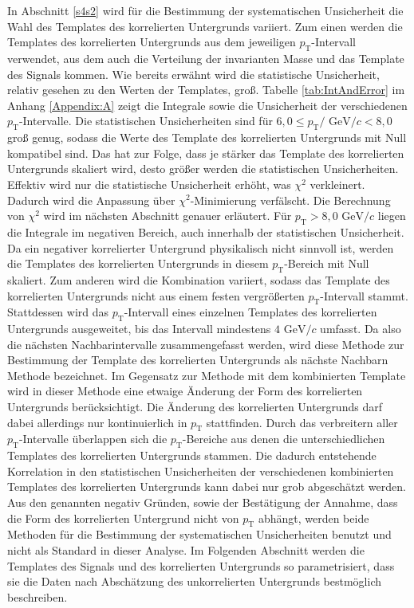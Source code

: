 In Abschnitt \ref{s4s2} wird für die Bestimmung der systematischen Unsicherheit die Wahl des Templates des korrelierten Untergrunds variiert.
\newline
Zum einen werden die Templates des korrelierten Untergrunds aus dem jeweiligen $p_\text{T}$-Intervall verwendet, aus dem auch die Verteilung der invarianten Masse und das Template des Signals kommen.
Wie bereits erwähnt wird die statistische Unsicherheit, relativ gesehen zu den Werten der Templates, groß.
Tabelle \ref{tab:IntAndError} im Anhang \ref{Appendix:A} zeigt die Integrale sowie die Unsicherheit der verschiedenen $p_\text{T}$-Intervalle.
Die statistischen Unsicherheiten sind für $6,0 \leq p_\text{T}/\text{ GeV}/c < 8,0 $ groß genug, sodass die Werte des Template des korrelierten Untergrunds mit Null kompatibel sind.
Das hat zur Folge, dass je stärker das Template des korrelierten Untergrunds skaliert wird, desto größer werden die statistischen Unsicherheiten.
Effektiv wird nur die statistische Unsicherheit erhöht, was $\chi^{2}$ verkleinert.
Dadurch wird die Anpassung über $\chi^{2}$-Minimierung verfälscht.
Die Berechnung von $\chi^{2}$ wird im nächsten Abschnitt genauer erläutert.
\newline
Für $p_\text{T} > 8,0 \text{ GeV}/c$ liegen die Integrale im negativen Bereich, auch innerhalb der statistischen Unsicherheit.
Da ein negativer korrelierter Untergrund physikalisch nicht sinnvoll ist, werden die Templates des korrelierten Untergrunds in diesem $p_\text{T}$-Bereich mit Null skaliert.
\newline
Zum anderen wird die Kombination variiert, sodass das Template des korrelierten Untergrunds nicht aus einem festen vergrößerten $p_\text{T}$-Intervall stammt.
Stattdessen wird das $p_\text{T}$-Intervall eines einzelnen Templates des korrelierten Untergrunds ausgeweitet, bis das Intervall mindestens $4\text{ GeV}/c$ umfasst.
Da also die nächsten Nachbarintervalle zusammengefasst werden, wird diese Methode zur Bestimmung der Template des korrelierten Untergrunds als nächste Nachbarn Methode bezeichnet.
Im Gegensatz zur Methode mit dem kombinierten Template wird in dieser Methode eine etwaige Änderung der Form des korrelierten Untergrunds berücksichtigt.
Die Änderung des korrelierten Untergrunds darf dabei allerdings nur kontinuierlich in $p_\text{T}$ stattfinden.
Durch das verbreitern aller $p_\text{T}$-Intervalle überlappen sich die $p_\text{T}$-Bereiche aus denen die unterschiedlichen Templates des korrelierten Untergrunds stammen.
Die dadurch entstehende Korrelation in den statistischen Unsicherheiten der verschiedenen kombinierten Templates des korrelierten Untergrunds kann dabei nur grob abgeschätzt werden. 
\newline
Aus den genannten negativ Gründen, sowie der Bestätigung der Annahme, dass die Form des korrelierten Untergrund nicht von $p_\text{T}$ abhängt, werden beide Methoden für die Bestimmung der systematischen Unsicherheiten benutzt und nicht als Standard in dieser Analyse.
\newline
Im Folgenden Abschnitt werden die Templates des Signals und des korrelierten Untergrunds so parametrisiert, dass sie die Daten nach Abschätzung des unkorrelierten Untergrunds bestmöglich beschreiben.